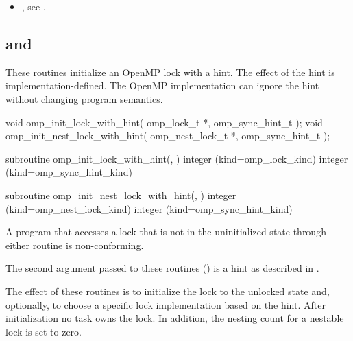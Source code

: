 \crossreferences
\begin{itemize}
\item {}, see
.
\end{itemize}



\subsection[\hcode{omp_init_lock_with_hint} and \\
\hcode{omp_init_nest_lock_with_hint}]{ and \\
}
\label{subsec:omp_init_lock_with_hint and omp_init_nest_lock_with_hint}
\summary
These routines initialize an OpenMP lock with a hint. The effect 
of the hint is implementation-defined. The OpenMP implementation
can ignore the hint without changing program semantics.

\format
\begin{ccppspecific}
\begin{ompcFunction}
void omp_init_lock_with_hint(
  omp_lock_t *,
  omp_sync_hint_t 
);
void omp_init_nest_lock_with_hint(
  omp_nest_lock_t *,
  omp_sync_hint_t 
);
\end{ompcFunction}
\end{ccppspecific}


\begin{fortranspecific}
\begin{ompfSubroutine}
subroutine omp_init_lock_with_hint(, )
integer (kind=omp_lock_kind) 
integer (kind=omp_sync_hint_kind) 

subroutine omp_init_nest_lock_with_hint(, )
integer (kind=omp_nest_lock_kind) 
integer (kind=omp_sync_hint_kind) 
\end{ompfSubroutine}
\end{fortranspecific}

\constraints
A program that accesses a lock that is not in the uninitialized 
state through either routine is non-conforming.

The second argument passed to these routines () is a hint
as described in .

\effect
The effect of these routines is to initialize the lock to the unlocked 
state and, optionally, to choose a specific lock implementation based 
on the hint. After initialization no task owns the lock. In addition, 
the nesting count for a nestable lock is set to zero.

